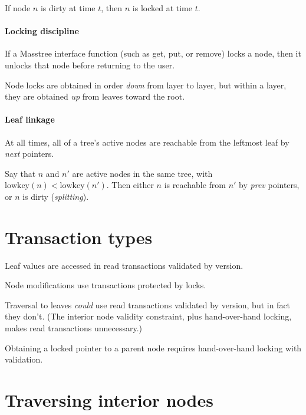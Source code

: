 \documentclass[11pt]{article}
\newcommand{\V}[1]{\textit{#1}}
\newcommand{\N}[1]{\text{#1}}
\begin{document}
If node \(n\) is dirty at time \(t\), then \(n\) is locked at time \(t\).

\paragraph{Locking discipline}

If a Masstree interface function (such as get, put, or remove) locks a
node, then it unlocks that node before returning to the user.

Node locks are obtained in order \emph{down} from layer to layer, but
within a layer, they are obtained \emph{up} from leaves toward the root.

\paragraph{Leaf linkage}

At all times, all of a tree's active nodes are reachable from the
leftmost leaf by \V{next} pointers.

Say that \(n\) and \(n'\) are active nodes in the same tree, with
\(\N{lowkey}(n) < \N{lowkey}(n')\). Then either \(n\) is reachable from
\(n'\) by \V{prev} pointers, or \(n\) is dirty (\V{splitting}).

\section{Transaction types}

Leaf values are accessed in read transactions validated by version.

Node modifications use transactions protected by locks.

Traversal to leaves \emph{could} use read transactions validated by
version, but in fact they don't. (The interior node validity
constraint, plus hand-over-hand locking, makes read transactions
unnecessary.)

Obtaining a locked pointer to a parent node requires hand-over-hand
locking with validation.

\section{Traversing interior nodes}
\end{document}
